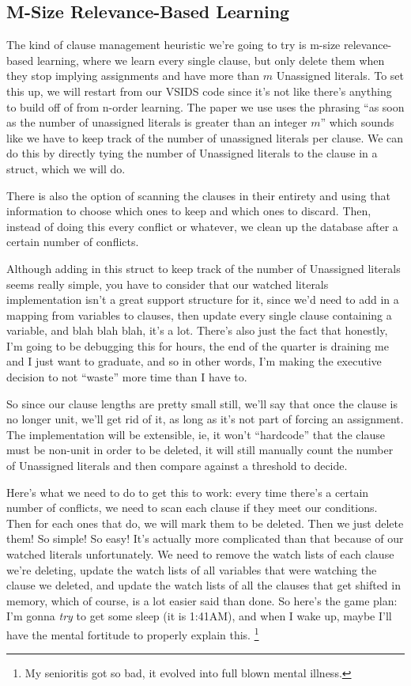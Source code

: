\documentclass[../main.tex]{subfiles}
\begin{document}
\subsection{M-Size Relevance-Based Learning}

The kind of clause management heuristic we're going to try is m-size relevance-based 
learning, where we learn every single clause, but only delete them when they stop 
implying assignments and have more than $m$ Unassigned literals. To set this up, 
we will restart from our VSIDS code since it's not like there's anything to build off of 
from n-order learning. The paper we use uses the phrasing ``as soon as the number of
unassigned literals is greater than an integer $m$'' which sounds like we have to keep 
track of the number of unassigned literals per clause. We can do this by directly tying 
the number of Unassigned literals to the clause in a struct, which we will do. 

There is also the option of scanning the clauses in their entirety and using that information 
to choose which ones to keep and which ones to discard. Then, instead of doing this every 
conflict or whatever, we clean up the database after a certain number of conflicts.

Although adding in this struct to keep track of the number of Unassigned literals seems 
really simple, you have to consider that our watched literals implementation isn't a great 
support structure for it, since we'd need to add in a mapping from variables to clauses,
then update every single clause containing a variable, and blah blah blah, it's a lot.
There's also just the fact that honestly, I'm going to be debugging this for hours, the 
end of the quarter is draining me and I just want to graduate, and so in other words,
I'm making the executive decision to not ``waste'' more time than I have to.

So since our clause lengths are pretty small still, we'll say that once the clause 
is no longer unit, we'll get rid of it, as long as it's not part of forcing an assignment.
The implementation will be extensible, ie, it won't ``hardcode'' that the clause must be 
non-unit in order to be deleted, it will still manually count the number of Unassigned 
literals and then compare against a threshold to decide.

Here's what we need to do to get this to work: every time there's a certain number 
of conflicts, we need to scan each clause if they meet our conditions. Then for 
each ones that do, we will mark them to be deleted. Then we just delete them! So simple!
So easy! It's actually more complicated than that because of our watched literals unfortunately.
We need to remove the watch lists of each clause we're deleting, update the watch lists of all 
variables that were watching the clause we deleted, and update the watch lists of all the clauses 
that get shifted in memory, which of course, is a lot easier said than done. So here's the game 
plan: I'm gonna \textit{try} to get some sleep (it is 1:41AM), and when I wake up, maybe I'll 
have the mental fortitude to properly explain this.
\footnote{My senioritis got so bad, it evolved into full blown mental illness.}
\end{document}

